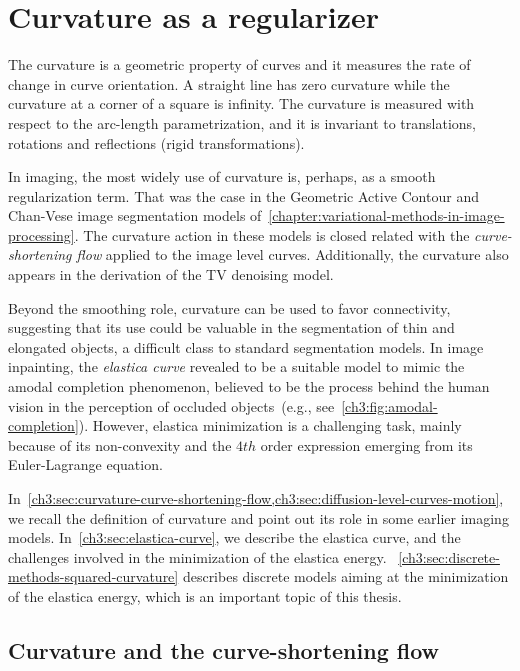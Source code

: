 \chapter{Curvature as a regularizer}
\label{chapter:curvature-prior}

The curvature is a geometric property of curves and it measures the rate of change in curve orientation. A straight line has zero curvature while the curvature at a corner of a square is infinity. The curvature is measured with respect to the arc-length parametrization, and it is invariant to translations, rotations and reflections (rigid transformations).

In imaging, the most widely use of curvature is, perhaps, as a smooth regularization term. That was the case in the Geometric Active Contour and Chan-Vese image segmentation models of~\cref{chapter:variational-methods-in-image-processing}. The curvature action in these models is closed related with the \emph{curve-shortening flow} applied to the image level curves. Additionally, the curvature also appears in the derivation of the TV denoising model.

Beyond the smoothing role, curvature can be used to favor connectivity, suggesting that its use could be valuable in the segmentation of thin and elongated objects, a difficult class to standard segmentation models. In image inpainting, the \emph{elastica curve} revealed to be a suitable model to mimic the amodal completion phenomenon, believed to be the process behind the human vision in the perception of occluded objects~(e.g., see~\cref{ch3:fig:amodal-completion}). However, elastica minimization is a challenging task, mainly because of its non-convexity and the $4th$ order expression emerging from its Euler-Lagrange equation.

In~\cref{ch3:sec:curvature-curve-shortening-flow,ch3:sec:diffusion-level-curves-motion}, we recall the definition of curvature and point out its role in some earlier imaging models. In~\cref{ch3:sec:elastica-curve}, we describe the elastica curve, and the challenges involved in the minimization of the elastica energy. ~\cref{ch3:sec:discrete-methods-squared-curvature} describes discrete models aiming at the minimization of the elastica energy, which is an important topic of this thesis.



\section{Curvature and the curve-shortening flow}
\label{ch3:sec:curvature-curve-shortening-flow}

